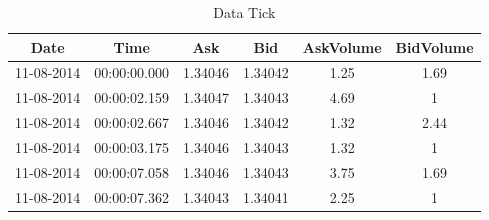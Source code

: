 \documentclass{beamer}
\begin{document}
            \begin{frame}
            \begin{table}[h!]
            \caption{Data Tick}
            \label{tab:ticks}
            \begin{center}
            \begin{adjustbox}{max width=\textwidth}
            \begin{tabular}{|c|c|c|c|c|c|}
            \hline
            Date & Time & Ask & Bid& AskVolume & BidVolume \\
            \hline
            11-08-2014 & 00:00:00.000 & 1.34046 & 1.34042 & 1.25 & 1.69 \\
            11-08-2014 & 00:00:02.159 & 1.34047 & 1.34043 & 4.69 & 1 \\
            11-08-2014 & 00:00:02.667 & 1.34046 & 1.34042 & 1.32 & 2.44 \\
            11-08-2014 & 00:00:03.175 & 1.34046 & 1.34043 & 1.32 & 1 \\
            11-08-2014 & 00:00:07.058 & 1.34046 & 1.34043 & 3.75 & 1.69 \\
            11-08-2014 & 00:00:07.362 & 1.34043 & 1.34041 & 2.25 & 1 \\
            \hline
            \end{tabular}
            \end{adjustbox}
            \end{center}
            \end{table}
            \end{frame}
\end{document}
